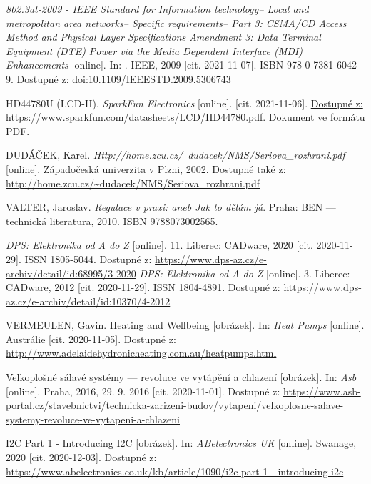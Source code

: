 \begin{thebibliography}{3}
\textit{802.3at-2009 - IEEE Standard for Information technology-- Local and metropolitan area networks-- Specific requirements-- Part 3: CSMA/CD Access Method and Physical Layer Specifications Amendment 3: Data Terminal Equipment (DTE) Power via the Media Dependent Interface (MDI) Enhancements} [online]. In: . IEEE, 2009 [cit. 2021-11-07]. ISBN 978-0-7381-6042-9. Dostupné z: doi:10.1109/IEEESTD.2009.5306743


HD44780U (LCD-II). \textit{SparkFun Electronics} [online]. [cit. 2021-11-06]. \url{Dostupné z: https://www.sparkfun.com/datasheets/LCD/HD44780.pdf}. Dokument ve formátu PDF.

DUDÁČEK, Karel. \textit{Http://home.zcu.cz/~dudacek/NMS/Seriova\_rozhrani.pdf} [online]. Západočeská univerzita v Plzni, 2002. Dostupné také z: \url{http://home.zcu.cz/~dudacek/NMS/Seriova\_rozhrani.pdf}


VALTER, Jaroslav. \textit{Regulace v praxi: aneb Jak to dělám já}. Praha: BEN --- technická literatura, 2010. ISBN 9788073002565.

\textit{DPS: Elektronika od A do Z} [online]. 11. Liberec: CADware, 2020 [cit. 2020-11-29]. ISSN 1805-5044. Dostupné z: \url{https://www.dps-az.cz/e-archiv/detail/id:68995/3-2020}
\textit{DPS: Elektronika od A do Z} [online]. 3. Liberec: CADware, 2012 [cit. 2020-11-29]. ISSN 1804-4891. Dostupné z: \url{https://www.dps-az.cz/e-archiv/detail/id:10370/4-2012}


VERMEULEN, Gavin. Heating and Wellbeing [obrázek]. In: \textit{Heat Pumps} [online]. Austrálie [cit. 2020-11-05]. Dostupné z: \url{http://www.adelaidehydronicheating.com.au/heatpumps.html}

Velkoplošné sálavé systémy --- revoluce ve vytápění a chlazení [obrázek]. In: \textit{Asb} [online]. Praha, 2016, 29. 9. 2016 [cit. 2020-11-01]. Dostupné z: \url{https://www.asb-portal.cz/stavebnictvi/technicka-zarizeni-budov/vytapeni/velkoplosne-salave-systemy-revoluce-ve-vytapeni-a-chlazeni}



I2C Part 1 - Introducing I2C [obrázek]. In: \textit{ABelectronics UK} [online]. Swanage, 2020 [cit. 2020-12-03]. Dostupné z: \url{https://www.abelectronics.co.uk/kb/article/1090/i2c-part-1---introducing-i2c}


\end{thebibliography}
